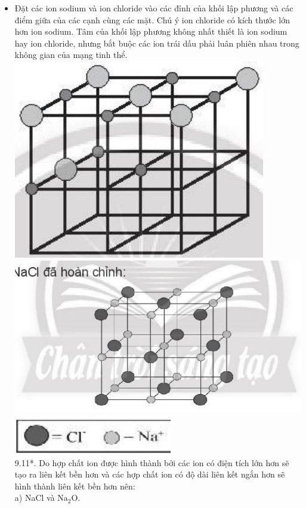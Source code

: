 \documentclass[10pt]{article}
\begin{document}
\begin{itemize}
  \item Đặt các ion sodium và ion chloride vào các đỉnh của khối lập phương và các điểm giữa của các cạnh cùng các mặt. Chú ý ion chloride có kích thước lớn hơn ion sodium. Tâm của khối lập phương không nhất thiết là ion sodium hay ion chloride, nhưng bắt buộc các ion trái dấu phải luân phiên nhau trong không gian của mạng tinh thể.\\
\includegraphics[max width=\textwidth, center]{2025_10_23_57761e23b8c46a11c3efg-21(1)}\\
\includegraphics[max width=\textwidth, center]{2025_10_23_57761e23b8c46a11c3efg-21(3)}\\
\includegraphics[max width=\textwidth, center]{2025_10_23_57761e23b8c46a11c3efg-21}\\
9.11*. Do hợp chất ion được hình thành bởi các ion có điện tích lớn hơn sẽ tạo ra liên kết bền hơn và các hợp chất ion có độ dài liên kết ngắn hơn sẽ hình thành liên kết bền hơn nên:\\
a) NaCl và $\mathrm{Na}_{2} \mathrm{O}$.
\end{itemize}
\end{document}
